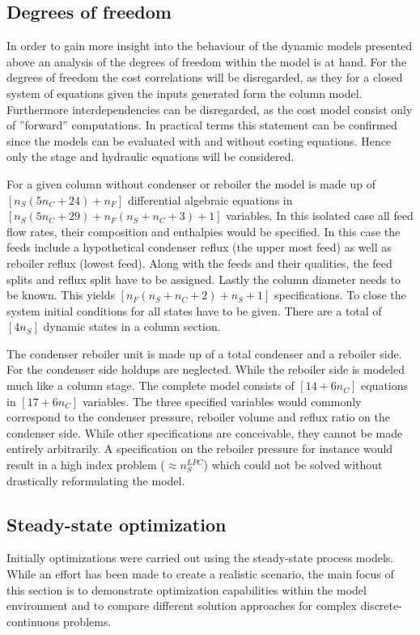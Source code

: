     \subsection{Degrees of freedom}
    In order to gain more insight into the behaviour of the dynamic models presented above an analysis
    of the degrees of freedom within the model is at hand. For the degrees of freedom the cost correlations
    will be disregarded, as they for a closed system of equations given the inputs generated form the column
    model. Furthermore interdependencies can be disregarded, as the cost model consist only of ''forward''
    computations. In practical terms this statement can be confirmed since the models can be evaluated
    with and without costing equations. Hence only the stage and hydraulic equations will be considered.

    For a given column without condenser or reboiler the model is made up of $[n_S (5n_C + 24) + n_F]$
    differential algebraic equations in $[n_S (5n_C + 29) + n_F (n_S + n_C + 3) + 1]$ variables. In this
    isolated case all feed flow rates, their composition and enthalpies would be specified. In this case
    the feeds include a hypothetical condenser reflux (the upper most feed) as well as reboiler reflux
    (lowest feed). Along with the feeds and their qualities, the feed splits and reflux split have to be
    assigned. Lastly the column diameter needs to be known. This yields $[n_F (n_S + n_C + 2) + n_S + 1]$
    specifications. To close the system initial conditions for all states have to be given. There
    are a total of $[4 n_S ]$ dynamic states in a column section.

    The condenser reboiler unit is made up of a total condenser and a reboiler side. For the condenser side
    holdups are neglected. While the reboiler side is modeled much like a column stage. The complete model
    consists of $[14 + 6 n_C]$ equations in $[17 + 6 n_C]$ variables. The three specified variables would
    commonly correspond to the condenser pressure, reboiler volume and reflux ratio on the condenser side.
    While other specifications are conceivable, they cannot be made entirely arbitrarily. A specification
    on the reboiler pressure for instance would result in a high index problem ($\approx n_S^{LPC}$) which
    could not be solved without drastically reformulating the model.

    \subsection{Steady-state optimization}
    Initially  optimizations were carried out using the steady-state process models.
    While an effort has been made to create a realistic scenario, the main focus of this section is to demonstrate
    optimization capabilities within the model environment \gproms and to compare different solution
    approaches for complex discrete-continuous problems.

